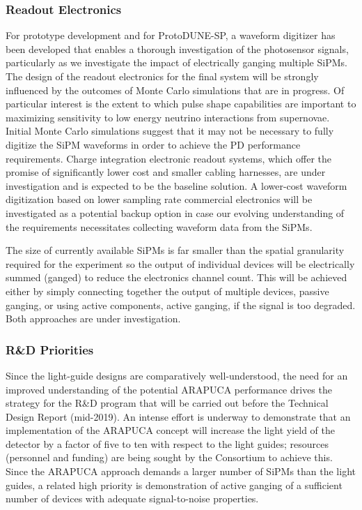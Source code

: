 \subsubsection{Readout Electronics} 
For prototype development and for ProtoDUNE-SP, a waveform digitizer has been developed that enables a thorough investigation of the photosensor signals, particularly as we investigate the impact of electrically ganging multiple SiPMs. The design of the readout electronics for the final system will be strongly influenced by the outcomes of Monte Carlo simulations that are in progress. Of particular interest is the extent to which pulse  shape capabilities are important to maximizing sensitivity to low energy neutrino interactions from supernovae. 
Initial Monte Carlo simulations suggest that it may not be necessary to fully digitize the SiPM waveforms in order to achieve the PD performance requirements.  Charge integration electronic readout systems, which offer the promise of significantly lower cost and smaller cabling harnesses, are under investigation and is expected to be the baseline solution.
A lower-cost waveform digitization based on lower sampling rate commercial electronics will be investigated as a potential backup option in case our evolving understanding of the requirements necessitates collecting waveform data from the SiPMs.

The size of currently available SiPMs is far smaller than the spatial granularity required for the experiment so the output of individual devices will be electrically summed (ganged) to reduce the electronics channel count. This will be achieved either by simply connecting together the output of multiple devices, passive ganging, or using active components, active ganging, if the signal is too degraded. Both approaches are under investigation. 

\subsubsection{R\&D Priorities} 
Since the light-guide designs are comparatively well-understood, the need for an improved understanding of the potential ARAPUCA performance drives the strategy for the R\&D program that will be carried out before the Technical Design Report (mid-2019). 
An intense effort is underway to demonstrate that an implementation of the ARAPUCA concept will increase the light yield of the detector by a factor of five to ten with respect to the light guides; resources (personnel and funding)  are being sought by the Consortium to achieve this.  Since the ARAPUCA approach demands a larger number of SiPMs than the light guides, a related high priority is demonstration of active ganging of a sufficient number of devices with adequate signal-to-noise properties.

